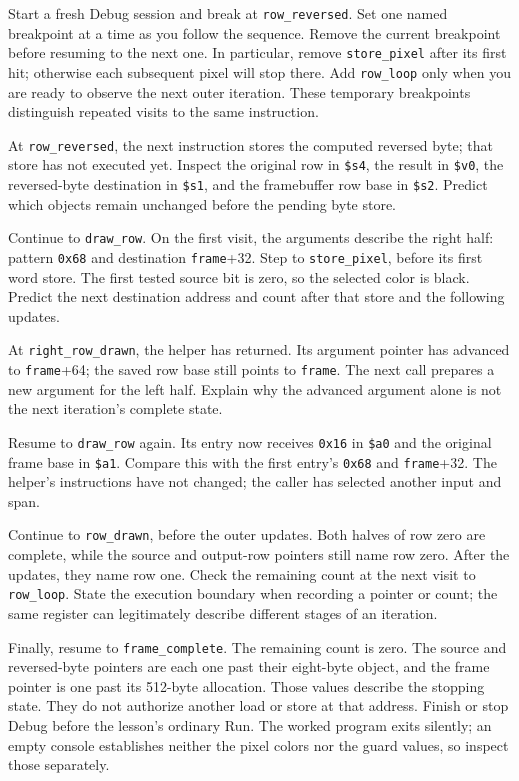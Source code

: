 Start a fresh Debug session and break at \texttt{row\_reversed}. Set one named
breakpoint at a time as you follow the sequence. Remove the current breakpoint
before resuming to the next one. In particular, remove \texttt{store\_pixel}
after its first hit; otherwise each subsequent pixel will stop there. Add
\texttt{row\_loop} only when you are ready to observe the next outer iteration.
These temporary breakpoints distinguish repeated visits to the same instruction.

At \texttt{row\_reversed}, the next instruction stores the computed reversed
byte; that store has not executed yet. Inspect the original row in
\texttt{\$s4}, the result in \texttt{\$v0}, the reversed-byte destination in
\texttt{\$s1}, and the framebuffer row base in \texttt{\$s2}. Predict which
objects remain unchanged before the pending byte store.

Continue to \texttt{draw\_row}. On the first visit, the arguments describe the
right half: pattern \texttt{0x68} and destination \texttt{frame}+32. Step to
\texttt{store\_pixel}, before its first word store. The first tested source bit
is zero, so the selected color is black. Predict the next destination address
and count after that store and the following updates.

At \texttt{right\_row\_drawn}, the helper has returned. Its argument pointer
has advanced to \texttt{frame}+64; the saved row base still points to
\texttt{frame}. The next call prepares a new argument for the left half. Explain
why the advanced argument alone is not the next iteration's complete state.

Resume to \texttt{draw\_row} again. Its entry now receives \texttt{0x16}
in \texttt{\$a0} and the original frame base in \texttt{\$a1}. Compare this
with the first entry's \texttt{0x68} and \texttt{frame}+32. The helper's
instructions have not changed; the caller has selected another input and span.

Continue to \texttt{row\_drawn}, before the outer updates. Both halves of row zero
are complete, while the source and output-row pointers still name row zero.
After the updates, they name row one. Check the remaining count at the next visit
to \texttt{row\_loop}. State the execution boundary when recording a pointer or
count; the same register can legitimately describe different stages of an iteration.

Finally, resume to \texttt{frame\_complete}. The remaining count is zero.
The source and reversed-byte pointers are each one past their eight-byte object,
and the frame pointer is one past its 512-byte allocation. Those values describe
the stopping state. They do not authorize another load or store at that address.
Finish or stop Debug before the lesson's ordinary Run. The worked program exits
silently; an empty console establishes neither the pixel colors nor the guard
values, so inspect those separately.

